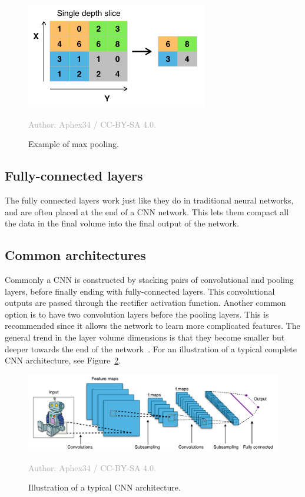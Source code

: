 \documentclass{kththesis}
\newcommand{\source}[1]{\vspace{-5mm}\caption*{\textcolor{darkgray}{Author: {#1}}\vspace{-7mm}} }
\begin{document}
\begin{figure}
  \begin{center}
    \includegraphics[width=80mm]{img/max_pooling.png}
    \caption{Example of max pooling.}
    \source{Aphex34 / CC-BY-SA 4.0.}
    \label{fig:max_pooling}
  \end{center}
\end{figure}

\subsection{Fully-connected layers}
The fully connected layers work just like they do in traditional neural networks, and are often placed at the end of a CNN network. This lets them compact all the data in the final volume into the final output of the network.

\subsection{Common architectures}
Commonly a CNN is constructed by stacking pairs of convolutional and pooling layers, before finally ending with fully-connected layers. This convolutional outputs are passed through the rectifier activation function. Another common option is to have two convolution layers before the pooling layers. This is recommended since it allows the network to learn more complicated features. The general trend in the layer volume dimensions is that they become smaller but deeper towards the end of the network~\cite{cnnIntro}. For an illustration of a typical complete CNN architecture, see Figure~\ref{fig:typical_cnn}.

\begin{figure}
  \begin{center}
    \includegraphics[width=150mm]{img/typical_cnn.png}
    \caption{Illustration of a typical CNN architecture.}
    \source{Aphex34 / CC-BY-SA 4.0.}
    \label{fig:typical_cnn}
  \end{center}
\end{figure}
\end{document}
